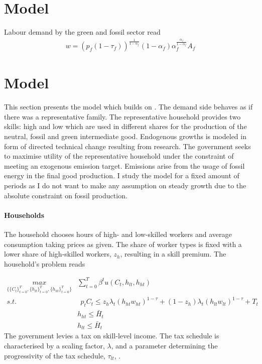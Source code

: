
\section{Model}
Labour demand by the green and fossil sector read
\begin{align*}
w=(p_f(1-\tau_f))^{\frac{1}{1-\alpha_f}}(1-\alpha_f)\alpha_f^{\frac{\alpha_f}{1-\alpha_f}}A_f
\end{align*}


\section{Model}
This section presents the model which builds on \cite{Fried2018ClimateAnalysis}. 
The demand side behaves as if there was a representative family. The representative household provides two skills: high and low which are used in different shares for the production of the neutral, fossil and green intermediate good.
Endogenous growths is modeled in form of directed technical change resulting from research. The government seeks to maximise utility of the representative household under the constraint of meeting an exogenous emission target. Emissions arise from the usage of fossil energy in the final good production. 
I study the model for a fixed amount of periods as I do not want to make any assumption on steady growth due to the absolute constraint on fossil production. 

\paragraph{Households}
 The household chooses hours of high- and low-skilled workers and average consumption taking prices as given. The share of worker types is fixed with a lower share of high-skilled workers, $z_h$, resulting in a skill premium. The household's problem reads

\begin{align}
\underset{\{\{C_{t}\}_{t=0}^{T}, \{h_{lt}\}_{t=0}^{T}, \{h_{ht}\}_{t=0}^{T}\}}{max}&
\sum_{t=0}^{T}\beta^t u(C_{t}, h_{lt}, h_{ht})\\
s.t.& \ \ p_{t}C_{t}\leq%
z_h\lambda_t \left(h_{ht}w_{ht}\right)^{1-\tau}+(1-z_h)\lambda_t\left(h_{lt}w_{lt}\right)^{1-\tau}+T_t\\
\ & h_{ht}\leq \bar{H}_t\\
\ & h_{lt}\leq \bar{H}_t
\end{align}
The government levies a tax on skill-level income. The tax schedule is characterised by  a scaling factor, $\lambda$, and a parameter determining the progressivity of the tax schedule, $\tau_{lt}$, \citep[compare, e.g.,][]{Heathcote2017OptimalFramework}. 

